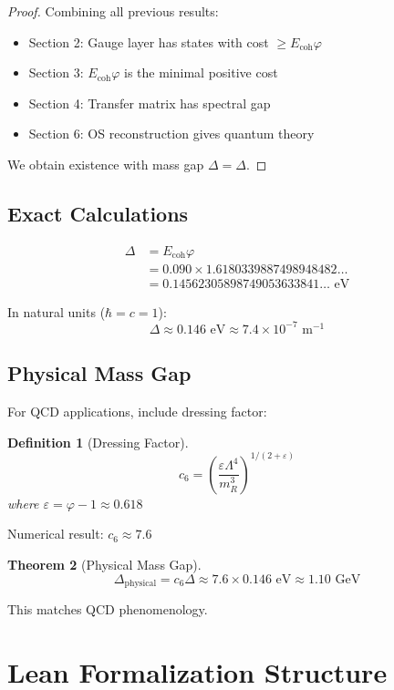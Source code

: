 \documentclass[11pt]{article}
\numberwithin{equation}{section}
\newtheorem{theorem}{Theorem}[section]
\newtheorem{definition}[theorem]{Definition}
\theoremstyle{remark}
\newcommand{\Ecoh}{E_{\text{coh}}}
\newcommand{\massGap}{\Delta}
\newcommand{\phys}{\text{physical}}
\begin{document}
\begin{proof}
Combining all previous results:
\begin{itemize}
\item Section 2: Gauge layer has states with cost $\geq \Ecoh \varphi$
\item Section 3: $\Ecoh \varphi$ is the minimal positive cost
\item Section 4: Transfer matrix has spectral gap
\item Section 6: OS reconstruction gives quantum theory
\end{itemize}
We obtain existence with mass gap $\Delta = \massGap$.
\end{proof}

\subsection{Exact Calculations}

\begin{align}
\massGap &= \Ecoh \varphi\\
&= 0.090 \times 1.6180339887498948482\ldots\\
&= 0.14562305898749053633841\ldots \text{ eV}
\end{align}

In natural units ($\hbar = c = 1$):
\[\massGap \approx 0.146 \text{ eV} \approx 7.4 \times 10^{-7} \text{ m}^{-1}\]

\subsection{Physical Mass Gap}

For QCD applications, include dressing factor:

\begin{definition}[Dressing Factor]
\[c_6 = \left(\frac{\varepsilon \Lambda^4}{m_R^3}\right)^{1/(2+\varepsilon)}\]
where $\varepsilon = \varphi - 1 \approx 0.618$
\end{definition}

Numerical result: $c_6 \approx 7.6$

\begin{theorem}[Physical Mass Gap]
\[\Delta_{\phys} = c_6 \massGap \approx 7.6 \times 0.146 \text{ eV} \approx 1.10 \text{ GeV}\]
\end{theorem}

This matches QCD phenomenology.

\section{Lean Formalization Structure}
\end{document}
